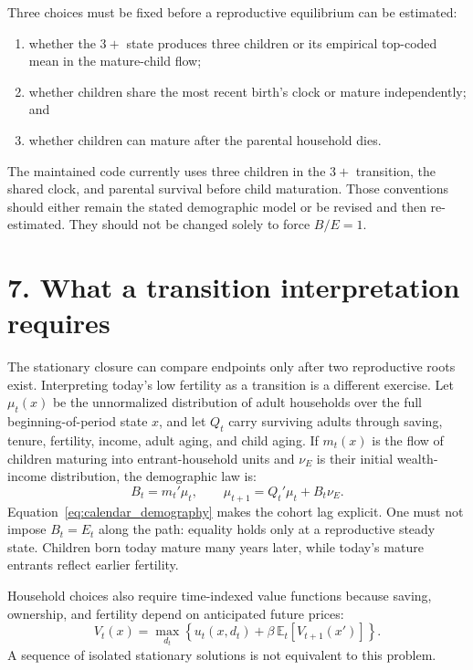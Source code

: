 \documentclass[11pt]{article}
\begin{document}
Three choices must be fixed before a reproductive equilibrium can be estimated:
\begin{enumerate}
 \item whether the $3+$ state produces three children or its empirical
 top-coded mean in the mature-child flow;
 \item whether children share the most recent birth's clock or mature
 independently; and
 \item whether children can mature after the parental household dies.
\end{enumerate}
The maintained code currently uses three children in the $3+$ transition, the
shared clock, and parental survival before child maturation.  Those conventions
should either remain the stated demographic model or be revised and then
re-estimated.  They should not be changed solely to force $B/E=1$.

\clearpage
\section*{7. What a transition interpretation requires}

The stationary closure can compare endpoints only after two reproductive roots
exist.  Interpreting today's low fertility as a transition is a different
exercise.  Let $\mu_t(x)$ be the unnormalized distribution of adult households
over the full beginning-of-period state $x$, and let $Q_t$ carry surviving
adults through saving, tenure, fertility, income, adult aging, and child aging.
If $m_t(x)$ is the flow of children maturing into entrant-household units and
$\nu_E$ is their initial wealth-income distribution, the demographic law is:
\begin{equation}
 B_t=m_t'\mu_t,
 \qquad
 \mu_{t+1}=Q_t'\mu_t+B_t\nu_E.
 \label{eq:calendar_demography}
\end{equation}
Equation~\eqref{eq:calendar_demography} makes the cohort lag explicit.  One
must not impose $B_t=E_t$ along the path: equality holds only at a reproductive
steady state.  Children born today mature many years later, while today's
mature entrants reflect earlier fertility.

Household choices also require time-indexed value functions because saving,
ownership, and fertility depend on anticipated future prices:
\begin{equation}
 V_t(x)=\max_{d_t}\left\{u_t(x,d_t)
 +\beta\,\mathbb E_t[V_{t+1}(x')]\right\}.
 \label{eq:calendar_bellman}
\end{equation}
A sequence of isolated stationary solutions is not equivalent to this problem.
\end{document}
